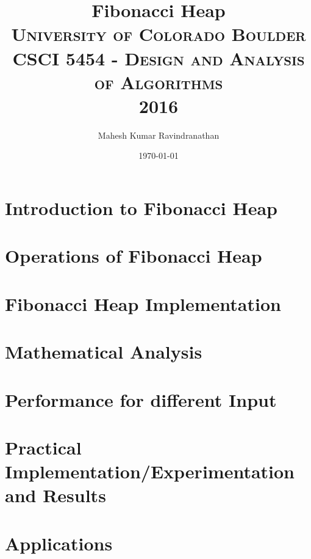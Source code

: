 \documentclass[10pt]{sig-alternate-05-2015}
\title{Fibonacci Heap \\ \textsc{University of Colorado Boulder} \\ \textsc{CSCI 5454 - Design and Analysis of Algorithms} \\ \textsc{2016} } %
\author{Mahesh Kumar Ravindranathan } %
\date{\today} %
\begin{document}
\maketitle %


\section{Introduction to Fibonacci Heap}

\section{Operations of Fibonacci Heap}

\section{Fibonacci Heap Implementation}

\section{Mathematical Analysis}

\section{Performance for different Input}

\section{Practical Implementation/Experimentation and Results}

\section{Applications}






\end{document}

